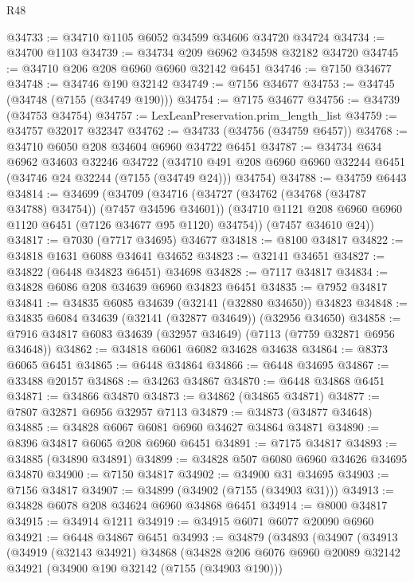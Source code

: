 \begin{lexlean}{R48}
\begin{coremodule}
@34733 := @34710 @1105 @6052 @34599 @34606 @34720 @34724
@34734 := @34700 @1103
@34739 := @34734 @209 @6962 @34598 @32182 @34720
@34745 := @34710 @206 @208 @6960 @6960 @32142 @6451
@34746 := @7150 @34677
@34748 := @34746 @190 @32142
@34749 := @7156 @34677
@34753 := @34745 (@34748 (@7155 (@34749 @190)))
@34754 := @7175 @34677
@34756 := @34739 (@34753 @34754)
@34757 := LexLeanPreservation.prim_length_list
@34759 := @34757 @32017 @32347
@34762 := @34733 (@34756 (@34759 @6457))
@34768 := @34710 @6050 @208 @34604 @6960 @34722 @6451
@34787 := @34734
    @634
    @6962
    @34603
    @32246
    @34722
    (@34710 @491 @208 @6960 @6960 @32244 @6451 (@34746 @24 @32244 (@7155 (@34749 @24))) @34754)
@34788 := @34759 @6443
@34814 := @34699
    (@34709
      (@34716
        (@34727 (@34762 (@34768 (@34787 @34788) @34754)) (@7457 @34596 @34601))
        (@34710 @1121 @208 @6960 @6960 @1120 @6451 (@7126 @34677 @95 @1120) @34754))
      (@7457 @34610 @24))
@34817 := @7030 (@7717 @34695) @34677
@34818 := @8100 @34817
@34822 := @34818 @1631 @6088 @34641 @34652
@34823 := @32141 @34651
@34827 := @34822 (@6448 @34823 @6451) @34698
@34828 := @7117 @34817
@34834 := @34828 @6086 @208 @34639 @6960 @34823 @6451
@34835 := @7952 @34817
@34841 := @34835 @6085 @34639 (@32141 (@32880 @34650)) @34823
@34848 := @34835 @6084 @34639 (@32141 (@32877 @34649)) (@32956 @34650)
@34858 := @7916 @34817 @6083 @34639 (@32957 @34649) (@7113 (@7759 @32871 @6956 @34648))
@34862 := @34818 @6061 @6082 @34628 @34638
@34864 := @8373 @6065 @6451
@34865 := @6448 @34864
@34866 := @6448 @34695
@34867 := @33488 @20157
@34868 := @34263 @34867
@34870 := @6448 @34868 @6451
@34871 := @34866 @34870
@34873 := @34862 (@34865 @34871)
@34877 := @7807 @32871 @6956 @32957 @7113
@34879 := @34873 (@34877 @34648)
@34885 := @34828 @6067 @6081 @6960 @34627 @34864 @34871
@34890 := @8396 @34817 @6065 @208 @6960 @6451
@34891 := @7175 @34817
@34893 := @34885 (@34890 @34891)
@34899 := @34828 @507 @6080 @6960 @34626 @34695 @34870
@34900 := @7150 @34817
@34902 := @34900 @31 @34695
@34903 := @7156 @34817
@34907 := @34899 (@34902 (@7155 (@34903 @31)))
@34913 := @34828 @6078 @208 @34624 @6960 @34868 @6451
@34914 := @8000 @34817
@34915 := @34914 @1211
@34919 := @34915 @6071 @6077 @20090 @6960
@34921 := @6448 @34867 @6451
@34993 := @34879
    (@34893
      (@34907
        (@34913
          (@34919
            (@32143 @34921)
            @34868
            (@34828
              @206
              @6076
              @6960
              @20089
              @32142
              @34921
              (@34900 @190 @32142 (@7155 (@34903 @190)))

\end{coremodule}
\end{lexlean}
